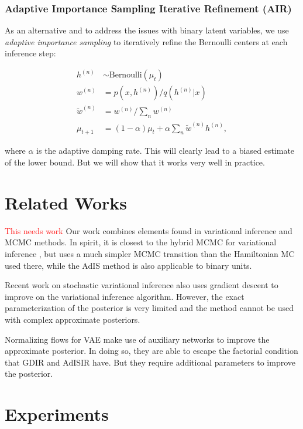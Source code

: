 \documentclass{article} %
\newcommand{\alert}[1]{\textcolor{red}{#1}}
\newcommand{\Bernoulli}{\text{Bernoulli}}
\begin{document}
\subsubsection{Adaptive Importance Sampling Iterative Refinement (AIR)}
As an alternative and to address the issues with binary latent variables, we use \emph{adaptive importance sampling} \citep{karamchandani1989adaptive} to iteratively refine the Bernoulli centers at each inference step:

\begin{align}
    h^{(n)} &\sim \Bernoulli(\mu_t) \nonumber \\
w^{(n)} &= p(x, h^{(n)}) / q(h^{(n)} | x) \nonumber \\
\tilde{w}^{(n)} &= w^{(n)} / \sum_n w^{(n)} \nonumber \\
\mu_{t+1} &= (1 - \alpha) \mu_t + \alpha \sum_n \tilde{w}^{(n)} h^{(n)},
\end{align}

where $\alpha$ is the adaptive damping rate. This will clearly lead to a biased estimate of the lower bound. But we will show that it works very well in practice.

\section{Related Works}
\alert{This needs work}
Our work combines elements found in variational inference and MCMC methods. In spirit, it is closest to the hybrid MCMC for variational inference \citep{salimans2014markov}, but uses a much simpler MCMC transition than the Hamiltonian MC used there, while the AdIS method is also applicable to binary units.

Recent work on stochastic variational inference \cite{hoffman2013stochastic} also uses gradient descent to improve on the variational inference algorithm. However, the exact parameterization of the posterior is very limited and the method cannot be used with complex approximate posteriors. 

Normalizing flows for VAE \citep{rezende2015variational} make use of auxiliary networks to improve the approximate posterior. In doing so, they are able to escape the factorial condition that GDIR and AdISIR have. But they require additional parameters to improve the posterior.

\section{Experiments}
\end{document}

